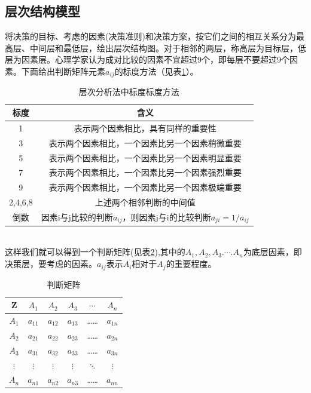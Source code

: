 \documentclass{ctexart}
\begin{document}
\subsection{层次结构模型}
\setlength{\parindent}{2em}将决策的目标、考虑的因素(决策准则)和决策方案，按它们之间的相互关系分为最高层、中间层和最低层，绘出层次结构图。对于相邻的两层，称高层为目标层，低层为因素层。心理学家认为成对比较的因素不宜超过9个，即每层不要超过9个因素。下面给出判断矩阵元素$a_{ij}$的标度方法（见表\ref{表:1}）。
\begin{table}[h!]
\centering
\begin{center}
 \begin{tabular}{||c c||} 
 \hline
 标度 & 含义\\ [0.5ex] 
 \hline\hline
 1 & 表示两个因素相比，具有同样的重要性\\ 
 \hline
 3 & 表示两个因素相比，一个因素比另一个因素稍微重要\\ 
 \hline
 5 & 表示两个因素相比，一个因素比另一个因素明显重要\\ 
 \hline
 7 & 表示两个因素相比，一个因素比另一个因素强烈重要\\ 
 \hline
 9 & 表示两个因素相比，一个因素比另一个因素极端重要\\  
  \hline
 2,4,6,8 & 上述两个相邻判断的中间值\\  
  \hline
 倒数 & 因素i与j比较的判断$a_{ij}$，则因素j与i的比较判断$a_{ji}=1/a_{ij}$\\  [1ex] 
 \hline
\end{tabular}
\end{center}
\caption{层次分析法中标度标度方法}
\label{表:1}
\end{table}\\

\setlength{\parindent}{2em}这样我们就可以得到一个判断矩阵(见表\ref{表:2}),其中的$A_{1},A_{2},A_{3}.\cdots.A_{n}$为底层因素，即决策层，要考虑的因素。$a_{ij}$表示$A_{i}$相对于$A_{j}$的重要程度。
\begin{table}[h!]
\centering
\begin{center}
 \begin{tabular}{|c|c|c|c|c|c|} 
 \hline
 Z & $A_{1}$ & $A_{2}$ & $A_{3}$ & $\cdots$ & $A_{n}$ \\
 \hline
 $A_{1}$  & $a_{11}$ & $a_{12}$ & $a_{13}$ & …… & $a_{1n}$ \\
 \hline
  $A_{2}$  & $a_{21}$ & $a_{22}$ & $a_{23}$ & …… & $a_{2n}$ \\
 \hline
  $A_{3}$  & $a_{31}$ & $a_{32}$ & $a_{33}$ & …… & $a_{3n}$ \\
 \hline
  $\vdots$ & $\vdots$ & $\vdots$ & $\vdots$ & $\ddots$ & $\vdots$ \\
 \hline
  $A_{n}$  & $a_{n1}$ & $a_{n2}$ & $a_{n3}$ & …… & $a_{nn}$ \\ [1ex] 
 \hline
\end{tabular}
\end{center}
\caption{判断矩阵}
\label{表:2}
\end{table}
\end{document}
